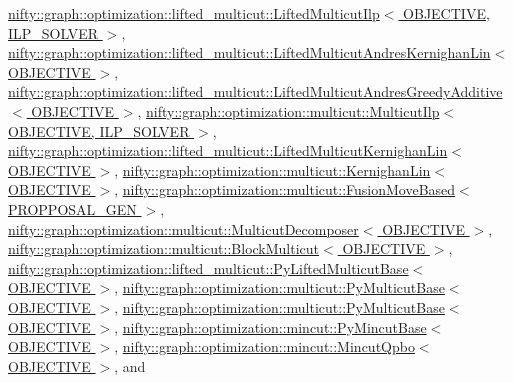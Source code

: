 \hyperlink{classnifty_1_1graph_1_1optimization_1_1lifted__multicut_1_1LiftedMulticutIlp_a4ba284855caaecba619ae4a5296a1d34}{nifty\+::graph\+::optimization\+::lifted\+\_\+multicut\+::\+Lifted\+Multicut\+Ilp$<$ O\+B\+J\+E\+C\+T\+I\+V\+E, I\+L\+P\+\_\+\+S\+O\+L\+V\+E\+R $>$}, \hyperlink{classnifty_1_1graph_1_1optimization_1_1lifted__multicut_1_1LiftedMulticutAndresKernighanLin_a5b289b2eebd717084c52d02ab5adc3bf}{nifty\+::graph\+::optimization\+::lifted\+\_\+multicut\+::\+Lifted\+Multicut\+Andres\+Kernighan\+Lin$<$ O\+B\+J\+E\+C\+T\+I\+V\+E $>$}, \hyperlink{classnifty_1_1graph_1_1optimization_1_1lifted__multicut_1_1LiftedMulticutAndresGreedyAdditive_af1c4bc11b2a9d41a39ffd7881284c9a8}{nifty\+::graph\+::optimization\+::lifted\+\_\+multicut\+::\+Lifted\+Multicut\+Andres\+Greedy\+Additive$<$ O\+B\+J\+E\+C\+T\+I\+V\+E $>$}, \hyperlink{classnifty_1_1graph_1_1optimization_1_1multicut_1_1MulticutIlp_a5093a9286730b9deed24a200cc8c035b}{nifty\+::graph\+::optimization\+::multicut\+::\+Multicut\+Ilp$<$ O\+B\+J\+E\+C\+T\+I\+V\+E, I\+L\+P\+\_\+\+S\+O\+L\+V\+E\+R $>$}, \hyperlink{classnifty_1_1graph_1_1optimization_1_1lifted__multicut_1_1LiftedMulticutKernighanLin_a39c9b8f4ffa630538f76929e7f32d3e6}{nifty\+::graph\+::optimization\+::lifted\+\_\+multicut\+::\+Lifted\+Multicut\+Kernighan\+Lin$<$ O\+B\+J\+E\+C\+T\+I\+V\+E $>$}, \hyperlink{classnifty_1_1graph_1_1optimization_1_1multicut_1_1KernighanLin_adc35484926c8a62679ce6b1a7f0c17d6}{nifty\+::graph\+::optimization\+::multicut\+::\+Kernighan\+Lin$<$ O\+B\+J\+E\+C\+T\+I\+V\+E $>$}, \hyperlink{classnifty_1_1graph_1_1optimization_1_1multicut_1_1FusionMoveBased_a201502ed5e5497ad8c2f8c15a1d7510a}{nifty\+::graph\+::optimization\+::multicut\+::\+Fusion\+Move\+Based$<$ P\+R\+O\+P\+P\+O\+S\+A\+L\+\_\+\+G\+E\+N $>$}, \hyperlink{classnifty_1_1graph_1_1optimization_1_1multicut_1_1MulticutDecomposer_a3648245ab3ec1d06b2db9db4b5502cc8}{nifty\+::graph\+::optimization\+::multicut\+::\+Multicut\+Decomposer$<$ O\+B\+J\+E\+C\+T\+I\+V\+E $>$}, \hyperlink{classnifty_1_1graph_1_1optimization_1_1multicut_1_1BlockMulticut_af369bbbea2a0ccabc14ee8f60cc61a24}{nifty\+::graph\+::optimization\+::multicut\+::\+Block\+Multicut$<$ O\+B\+J\+E\+C\+T\+I\+V\+E $>$}, \hyperlink{classnifty_1_1graph_1_1optimization_1_1lifted__multicut_1_1PyLiftedMulticutBase_aaa5dc7bebebe87db1aa61aefb272a3a4}{nifty\+::graph\+::optimization\+::lifted\+\_\+multicut\+::\+Py\+Lifted\+Multicut\+Base$<$ O\+B\+J\+E\+C\+T\+I\+V\+E $>$}, \hyperlink{classnifty_1_1graph_1_1optimization_1_1multicut_1_1PyMulticutBase_ab84606e4d7799ee1b0dc3deacf4b72e6}{nifty\+::graph\+::optimization\+::multicut\+::\+Py\+Multicut\+Base$<$ O\+B\+J\+E\+C\+T\+I\+V\+E $>$}, \hyperlink{classnifty_1_1graph_1_1optimization_1_1multicut_1_1PyMulticutBase_ab84606e4d7799ee1b0dc3deacf4b72e6}{nifty\+::graph\+::optimization\+::multicut\+::\+Py\+Multicut\+Base$<$ O\+B\+J\+E\+C\+T\+I\+V\+E $>$}, \hyperlink{classnifty_1_1graph_1_1optimization_1_1mincut_1_1PyMincutBase_ac0809adf3acd325dc7a268bf948470bb}{nifty\+::graph\+::optimization\+::mincut\+::\+Py\+Mincut\+Base$<$ O\+B\+J\+E\+C\+T\+I\+V\+E $>$}, \hyperlink{classnifty_1_1graph_1_1optimization_1_1mincut_1_1MincutQpbo_acfb53c2d7e1841b07aa7bb3b6609528f}{nifty\+::graph\+::optimization\+::mincut\+::\+Mincut\+Qpbo$<$ O\+B\+J\+E\+C\+T\+I\+V\+E $>$}, and 